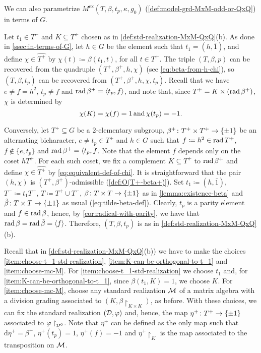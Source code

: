 We can also parametrize $M^{\mathrm{ex}}(T, \beta, t_p, \kappa, g_0)$ (\cref{def:model-grd-MxM-odd-or-QxQ}) in terms of $G$. 

Let $t_1 \in T^-$ and $K \subseteq T^+$ chosen as in \cref{def:std-realization-MxM-QxQ}(b). 
As done in \cref{ssec:in-terms-of-G}, let $h \in G$ be the element such that $t_1 = (h, \bar 1)$, and define $\chi \in \widehat{T^+}$ by $\chi(t) \coloneqq \beta(t_1, t)$, for all $t\in T^+$. 
The triple $(T, \beta, p)$ can be recovered from the quadruple $(T^+, \beta^+, h, \chi)$ (see \cref{eq:beta-from-h-chi}), so $(T, \beta, t_p)$ can be recovered from $(T^+, \beta^+, h, \chi, t_p)$. 
Recall that we have $e \neq f = h^2$, $t_p \neq f$ and $\operatorname{rad} \beta^+ = \langle t_p, f \rangle$, and note that, since $T^+ = K \times (\operatorname{rad} \beta^+)$, $\chi$ is determined by 
\[\label{eq:equivalent-def-of-chi}
    \chi(K) = \chi(f) = 1 \,\text{and}\, \chi(t_p) = -1.
\]

Conversely, let $T^+ \subseteq G$ be a $2$-elementary subgroup, $\beta^+\colon T^+ \times T^+ \to \{ \pm 1 \}$ be an alternating bicharacter, $e \neq t_p \in T^+$ and $h\in G$ such that $f\coloneqq h^2 \in \operatorname{rad} T^+$, $f \not\in \{e, t_p \}$ and $\operatorname{rad} \beta^+ = \langle t_p, f$. 
Note that the element $f$ depends only on the coset $hT^+$. 
For each such coset, we fix a complement $K \subseteq T^+$ to $\operatorname{rad} \beta^+$ and define $\chi \in \widehat{T^+}$ by \cref{eq:equivalent-def-of-chi}. 
It is straightforward that the pair $(h, \chi)$ is $(T^+, \beta^+)$-admissible (\cref{def:O(T+-beta+)}). 
Set $t_1 \coloneqq (h, \bar 1)$, $T^- \coloneqq t_1 T^+$, $T \coloneqq T^+ \cup T^-$, $\beta\colon T\times T\to \{ \pm 1 \}$ as in \cref{lemma:existence-beta} and $\tilde\beta\colon T\times T\to \{ \pm 1 \}$ as usual (\cref{eq:tilde-beta-def}). 
Clearly, $t_p$ is a parity element and $f\in \operatorname{rad} \beta$, hence, by \cref{cor:radical-with-parity}, we have that $\operatorname{rad} \beta = \operatorname{rad} \tilde\beta = \langle f \rangle$. 
Therefore, $(T, \beta, t_p)$ is as in \cref{def:std-realization-MxM-QxQ}(b). 

Recall that in \cref{def:std-realization-MxM-QxQ}(b)) we have to make the choices \eqref{item:choose-t_1-std-realization}, \eqref{item:K-can-be-orthogonal-to-t_1} and \eqref{item:choose-mc-M}. 
For \eqref{item:choose-t_1-std-realization} we choose $t_1$ and, for \eqref{item:K-can-be-orthogonal-to-t_1}, since $\beta(t_1, K) = 1$, we choose $K$.  
For \cref{item:choose-mc-M}, choose any standard realization $\mathcal M$ of a matrix algebra with a division grading  associated to $(K, \beta\restriction_{K\times K})$, as before. 
With these choices, we can fix the standard realization $(\mathcal{D}, \varphi)$ and, hence, the map $\eta^+ \colon T^+ \to \{ \pm 1 \}$ associated to $\varphi\restriction_{\mathcal{D}^{\bar0}}$. 
Note that $\eta^+$ can be defined as the only map such that $\mathrm{d}\eta^+ = \beta^+$, $\eta^+(t_p) = 1$, $\eta^+(f) = -1$ and $\eta^+\restriction_{K}$ is the map associated to the transposition on $\mathcal M$. 

